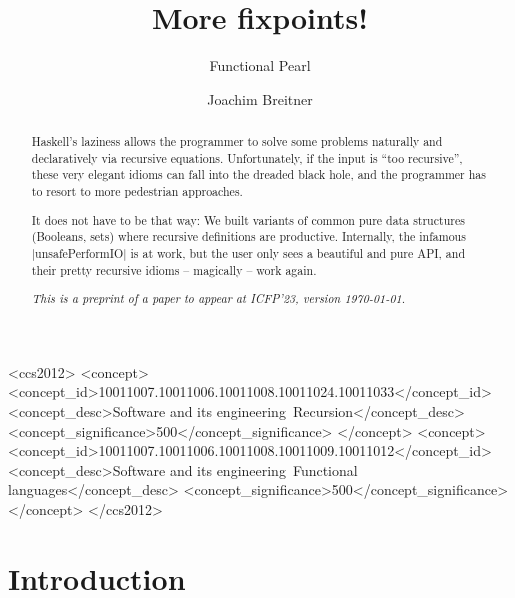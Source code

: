 \documentclass[manuscript,screen,acmsmall,nonacm]{acmart}
\begin{document}
\title{More fixpoints!}
\subtitle{Functional Pearl}

\author{Joachim Breitner}


\begin{abstract}
Haskell’s laziness allows the programmer to solve some problems naturally and declaratively via recursive equations. Unfortunately, if the input is “too recursive”, these very elegant idioms can fall into the dreaded black hole, and the programmer has to resort to more pedestrian approaches.

It does not have to be that way: We built variants of common pure data structures (Booleans, sets) where recursive definitions are productive. Internally, the infamous |unsafePerformIO| is at work, but the user only sees a beautiful and pure API, and their pretty recursive idioms -- magically -- work again.

\ifpreprint
\emph{This is a preprint of a paper to appear at ICFP'23, version \today.}
\fi
\end{abstract}

\begin{CCSXML}
<ccs2012>
   <concept>
       <concept_id>10011007.10011006.10011008.10011024.10011033</concept_id>
       <concept_desc>Software and its engineering~Recursion</concept_desc>
       <concept_significance>500</concept_significance>
       </concept>
   <concept>
       <concept_id>10011007.10011006.10011008.10011009.10011012</concept_id>
       <concept_desc>Software and its engineering~Functional languages</concept_desc>
       <concept_significance>500</concept_significance>
       </concept>
 </ccs2012>
\end{CCSXML}



\maketitle

\section{Introduction}
\end{document}
